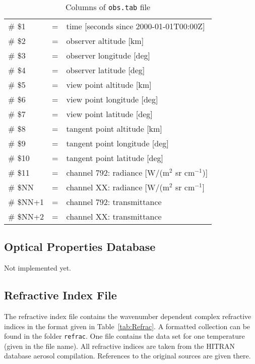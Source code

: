 \begin{table*}[!h]
\caption{Columns of \texttt{obs.tab} file}
\begin{tabular}{lcl}
\# \$1 & = & time [seconds since 2000-01-01T00:00Z] \\
\# \$2 & = & observer altitude [km] \\
\# \$3 & = & observer longitude [deg] \\
\# \$4 & = & observer latitude [deg] \\
\# \$5 & = & view point altitude [km] \\
\# \$6 & = & view point longitude [deg] \\
\# \$7 & = & view point latitude [deg] \\
\# \$8 & = & tangent point altitude [km] \\
\# \$9 & = & tangent point longitude [deg] \\
\# \$10 & = & tangent point latitude [deg] \\
\# \$11 & = & channel 792: radiance [W/(m$^2$ sr cm$^{-1}$)] \\
\# \$NN & = & channel XX: radiance [W/(m$^2$ sr cm$^{-1}$] \\
\# \$NN+1 & = & channel 792: transmittance \\
\# \$NN+2 & = & channel XX: transmittance \\
\end{tabular}
\end{table*} 


\subsection{Optical Properties Database}
\label{sec:OptData}
\todo Not implemented yet.


\subsection{Refractive Index File}
\label{sec:Refrac}
The refractive index file contains the wavenumber dependent complex refractive indices in the format given in Table~\ref{tab:Refrac}. A formatted collection can be found in the folder \texttt{refrac}. One file contains the data set for one temperature (given in the file name). All refractive indices are taken from the HITRAN database \citep{Rothman2009} aerosol compilation. References to the original sources are given there.

